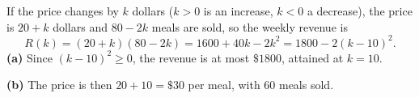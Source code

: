 If the price changes by $k$ dollars ($k>0$ is an increase, $k<0$ a decrease), the price is $20+k$ dollars and $80-2k$ meals are sold, so the weekly revenue is
\[R(k)=(20+k)(80-2k)=1600+40k-2k^2=1800-2(k-10)^2 .\]
\textbf{(a)} Since $(k-10)^2\ge0$, the revenue is at most $\boxed{\$1800}$, attained at $k=10$.

\textbf{(b)} The price is then $20+10=\boxed{\$30}$ per meal, with $60$ meals sold.

